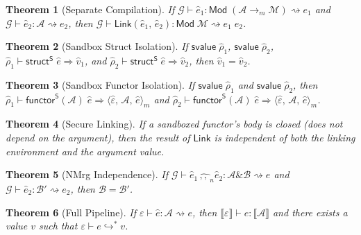 \documentclass{article}
\newtheorem{theorem}{Theorem}[section]
\newcommand{\fatcomma}{\mathbin{\,{,}{,}\,}}
\newcommand{\tand}{\mathbin{\&}}
\newcommand{\tarr}{\rightarrow}
\newcommand{\lsem}{\llbracket}
\newcommand{\rsem}{\rrbracket}
\newcommand{\kw}[1]{\mathsf{#1}}
\newcommand{\smark}{\mathsf{S}}
\newcommand{\shat}[1]{\hat{#1}}
\newcommand{\snmrg}{\mathbin{\hat{\fatcomma}_n}}
\newcommand{\mclos}[3]{\langle #1,\,#2,\,#3 \rangle_m}
\newcommand{\Link}[2]{\kw{Link}(#1,\,#2)}
\newcommand{\Struct}[2]{\kw{struct}^{#1}\;#2}
\newcommand{\Functor}[3]{\kw{functor}^{#1}(#2)\;#3}
\newcommand{\elmark}{\rightsquigarrow}
\newcommand{\sval}{\kw{svalue}}
\begin{document}
\begin{theorem}[Separate Compilation]
If\; $\mathcal{G} \vdash \shat{e}_1 : \kw{Mod}\;(\mathcal{A} \tarr_m \mathcal{M}) \elmark e_1$
and  $\mathcal{G} \vdash \shat{e}_2 : \mathcal{A} \elmark e_2$,
then $\mathcal{G} \vdash \Link{\shat{e}_1}{\shat{e}_2} : \kw{Mod}\;\mathcal{M} \elmark e_1\;e_2$.
\end{theorem}

\begin{theorem}[Sandbox Struct Isolation]
If\; $\sval\;\hat{\rho}_1$, $\sval\;\hat{\rho}_2$,
$\hat{\rho}_1 \vdash \Struct{\smark}{\shat{e}} \Rightarrow \shat{v}_1$,
and  $\hat{\rho}_2 \vdash \Struct{\smark}{\shat{e}} \Rightarrow \shat{v}_2$,
then $\shat{v}_1 = \shat{v}_2$.
\end{theorem}

\begin{theorem}[Sandbox Functor Isolation]
If\; $\sval\;\hat{\rho}_1$ and $\sval\;\hat{\rho}_2$,
then
$\hat{\rho}_1 \vdash \Functor{\smark}{\mathcal{A}}{\shat{e}} \Rightarrow \mclos{\hat{\varepsilon}}{\mathcal{A}}{\shat{e}}$
and
$\hat{\rho}_2 \vdash \Functor{\smark}{\mathcal{A}}{\shat{e}} \Rightarrow \mclos{\hat{\varepsilon}}{\mathcal{A}}{\shat{e}}$.
\end{theorem}

\begin{theorem}[Secure Linking]
If a sandboxed functor's body is closed (does not depend on the argument),
then the result of\/ $\kw{Link}$ is independent of both the linking
environment and the argument value.
\end{theorem}

\begin{theorem}[NMrg Independence]
If\; $\mathcal{G} \vdash \shat{e}_1 \snmrg \shat{e}_2 : \mathcal{A} \tand \mathcal{B} \elmark e$
and  $\mathcal{G} \vdash \shat{e}_2 : \mathcal{B}' \elmark e_2$,
then $\mathcal{B} = \mathcal{B}'$.
\end{theorem}

\begin{theorem}[Full Pipeline]
If\; $\varepsilon \vdash \shat{e} : \mathcal{A} \elmark e$,
then $\lsem\varepsilon\rsem \vdash e : \lsem\mathcal{A}\rsem$
and there exists a value $v$ such that $\varepsilon \vdash e \hookrightarrow^* v$.
\end{theorem}
\end{document}
